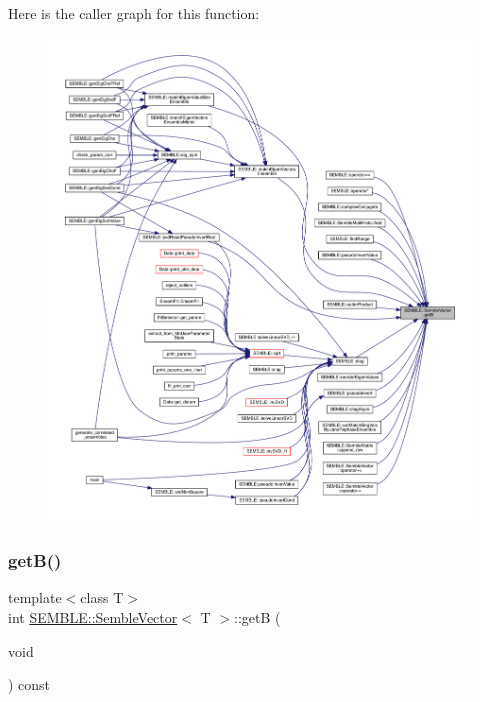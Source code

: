 Here is the caller graph for this function\+:
\nopagebreak
\begin{figure}[H]
\begin{center}
\leavevmode
\includegraphics[width=350pt]{d9/d94/structSEMBLE_1_1SembleVector_a30ac55c6514b63443ad073ccc4913051_icgraph}
\end{center}
\end{figure}
\mbox{\label{structSEMBLE_1_1SembleVector_a30ac55c6514b63443ad073ccc4913051}} 
\subsubsection{\texorpdfstring{getB()}{getB()}\hspace{0.1cm}{\footnotesize\ttfamily [2/2]}}
{\footnotesize\ttfamily template$<$class T$>$ \\
int \mbox{\hyperlink{structSEMBLE_1_1SembleVector}{S\+E\+M\+B\+L\+E\+::\+Semble\+Vector}}$<$ T $>$\+::getB (\begin{DoxyParamCaption}\item[{void}]{ }\end{DoxyParamCaption}) const\hspace{0.3cm}{\ttfamily [inline]}}

